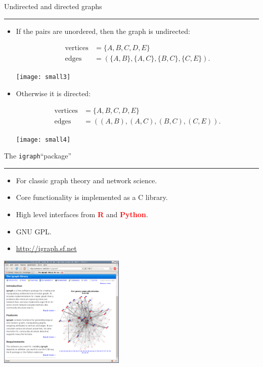 \documentclass[landscape,fleqno]{foils}
\newcommand{\stitle}[1]{{\color{blue}\Large #1\par\vspace*{10pt}\hrule}}
\newcommand{\cstitle}[1]{{\centering\color{blue}\Large #1\par\vspace*{10pt}\hrule}}
\renewcommand{\emph}[1]{\textcolor{red}{\bf #1}}
\newcommand{\igraph}{\texttt{{igraph}}\xspace}
\newenvironment{narrow}[2]{%
  \begin{list}{}{%
      \setlength{\topsep}{0pt}%
      \setlength{\leftmargin}{#1}%
      \setlength{\rightmargin}{#2}%
      \setlength{\listparindent}{\parindent}%
      \setlength{\itemindent}{\parindent}%
      \setlength{\parsep}{\parskip}}%
    \item[]}{\end{list}}
\begin{document}
\newpage
\cstitle{Undirected and directed graphs}
\begin{itemize}
\item If the pairs are unordered, then the graph is undirected:

  \begin{minipage}{0.7\textwidth}
    \begin{align} 
      \text{vertices} & =\{A,B,C,D,E\} \nonumber\\
      \text{edges}    & =( \{A,B\},\{A,C\},\{B,C\},\{C,E\} ). \nonumber
    \end{align}
  \end{minipage}\begin{minipage}{0.3\textwidth}
    \texttt{[image: small3]}
  \end{minipage}\pause

\item Otherwise it is directed:

  \begin{minipage}{0.7\textwidth}
    \begin{align} 
      \text{vertices} & =\{A,B,C,D,E\} \nonumber\\
      \text{edges}    & =( (A,B),(A,C),(B,C),(C,E) ). \nonumber
    \end{align}
  \end{minipage}\begin{minipage}{0.3\textwidth}
    \texttt{[image: small4]}
  \end{minipage}
\end{itemize}

\newpage
\stitle{The \igraph ``package''}

\begin{narrow}{0cm}{10cm}
\begin{itemize}
\item For classic graph theory and network science.
\item Core functionality is implemented as a C library.
\item High level interfaces from \emph{R} and \emph{Python}.
\item GNU GPL.
\item \url{http://igraph.sf.net}
\end{itemize}
\includegraphics[width=0.45\textwidth]{homepage}
\end{narrow}
\end{document}
